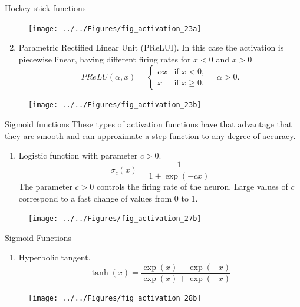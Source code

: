 \documentclass{beamer}
\begin{document}
\begin{frame}{Hockey stick functions}
	\begin{figure}[h]
		\centering
		\texttt{[image: ../../Figures/fig\_activation\_23a]}
	\end{figure}
	\begin{enumerate}
				\setcounter{enumi}{1}
		\item Parametric Rectified Linear Unit (PReLUI). In this case the activation is piecewise linear, having different firing rates for $x<0$ and $x>0$
		\begin{equation*}
	PReLU(\alpha, x)=  \begin{cases}
		\alpha x & \text{if } x <0,\\
		x & \text{if } x \ge 0.
	\end{cases} \quad \alpha >0.
\end{equation*}		
	
	\end{enumerate}
	\begin{figure}[h]
	\centering
	\texttt{[image: ../../Figures/fig\_activation\_23b]}
\end{figure}
\end{frame}

\begin{frame}{Sigmoid functions}
These types of activation functions have that advantage that they are smooth and can approximate a step function to any degree of accuracy.
	\begin{enumerate}
		\item Logistic function with parameter $c>0$.
		\begin{equation*}
			\sigma_c(x)= \frac{1}{1+ \exp(-cx)}
		\end{equation*}
		The parameter $c>0$ controls the firing rate of the neuron. Large values of $c $ correspond to a fast change of values from 0 to 1. 
	\end{enumerate}
	\begin{figure}[h]
	\centering
	\texttt{[image: ../../Figures/fig\_activation\_27b]}
\end{figure}
\end{frame}

\begin{frame}{Sigmoid Functions}
	\begin{enumerate}
		\item Hyperbolic tangent. 
		\begin{equation*}
			\tanh (x)= \frac{\exp(x)- \exp(-x)}{\exp(x)+ \exp(-x)}
		\end{equation*}
	\end{enumerate}
	\begin{figure}[h]
	\centering
	\texttt{[image: ../../Figures/fig\_activation\_28b]}
\end{figure}
\end{frame}
\end{document}
